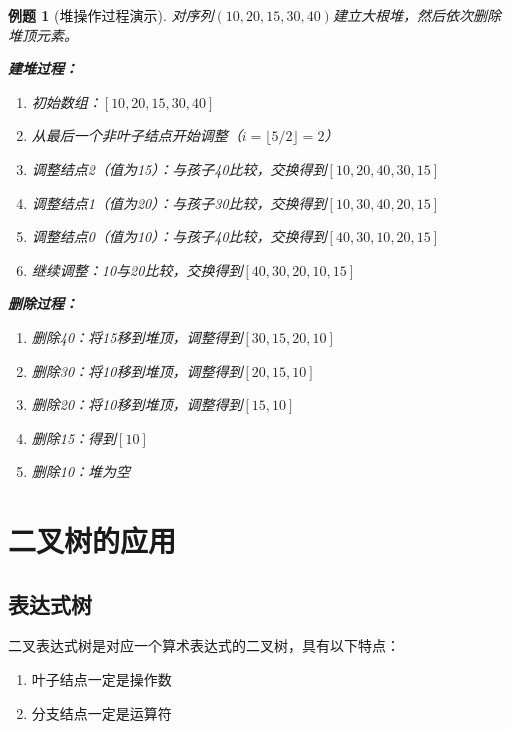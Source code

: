 \documentclass[12pt,a4paper]{amsart}
\newtheorem{example}{例题}[section]
\begin{document}
\begin{example}[堆操作过程演示]
对序列$(10, 20, 15, 30, 40)$建立大根堆，然后依次删除堆顶元素。

\textbf{建堆过程：}
\begin{enumerate}
\item 初始数组：$[10, 20, 15, 30, 40]$
\item 从最后一个非叶子结点开始调整（$i = \lfloor 5/2 \rfloor = 2$）
\item 调整结点2（值为15）：与孩子40比较，交换得到$[10, 20, 40, 30, 15]$
\item 调整结点1（值为20）：与孩子30比较，交换得到$[10, 30, 40, 20, 15]$
\item 调整结点0（值为10）：与孩子40比较，交换得到$[40, 30, 10, 20, 15]$
\item 继续调整：10与20比较，交换得到$[40, 30, 20, 10, 15]$
\end{enumerate}

\textbf{删除过程：}
\begin{enumerate}
\item 删除40：将15移到堆顶，调整得到$[30, 15, 20, 10]$
\item 删除30：将10移到堆顶，调整得到$[20, 15, 10]$
\item 删除20：将10移到堆顶，调整得到$[15, 10]$
\item 删除15：得到$[10]$
\item 删除10：堆为空
\end{enumerate}
\end{example}

\section{二叉树的应用}

\subsection{表达式树}

二叉表达式树是对应一个算术表达式的二叉树，具有以下特点：
\begin{enumerate}
\item 叶子结点一定是操作数
\item 分支结点一定是运算符
\end{enumerate}
\end{document}

